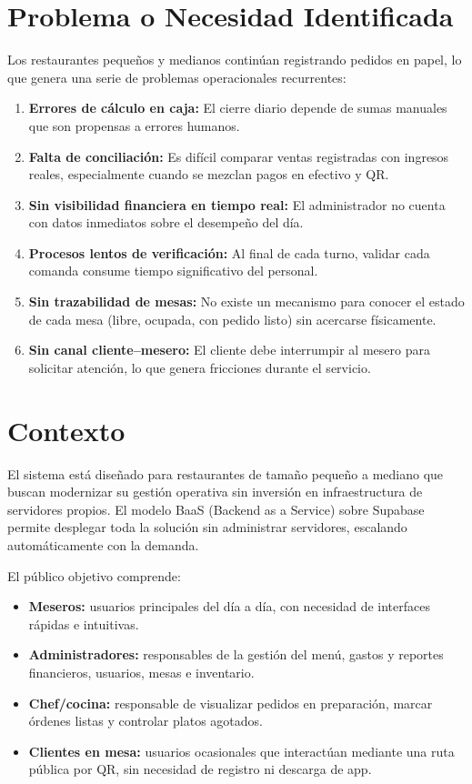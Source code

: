 \section{Problema o Necesidad Identificada}

Los restaurantes pequeños y medianos continúan registrando pedidos en papel, lo que
genera una serie de problemas operacionales recurrentes:

\begin{enumerate}[leftmargin=1.8em]
  \item \textbf{Errores de cálculo en caja:} El cierre diario depende de sumas
        manuales que son propensas a errores humanos.
  \item \textbf{Falta de conciliación:} Es difícil comparar ventas registradas con
        ingresos reales, especialmente cuando se mezclan pagos en efectivo y QR.
  \item \textbf{Sin visibilidad financiera en tiempo real:} El administrador no
        cuenta con datos inmediatos sobre el desempeño del día.
  \item \textbf{Procesos lentos de verificación:} Al final de cada turno, validar
        cada comanda consume tiempo significativo del personal.
  \item \textbf{Sin trazabilidad de mesas:} No existe un mecanismo para conocer
        el estado de cada mesa (libre, ocupada, con pedido listo) sin acercarse
        físicamente.
  \item \textbf{Sin canal cliente–mesero:} El cliente debe interrumpir al mesero
        para solicitar atención, lo que genera fricciones durante el servicio.
\end{enumerate}

\section{Contexto}

El sistema está diseñado para restaurantes de tamaño pequeño a mediano que buscan
modernizar su gestión operativa sin inversión en infraestructura de servidores
propios. El modelo BaaS (Backend as a Service) sobre Supabase permite desplegar
toda la solución sin administrar servidores, escalando automáticamente con la
demanda.

El público objetivo comprende:
\begin{itemize}[leftmargin=1.5em]
  \item \textbf{Meseros:} usuarios principales del día a día, con necesidad de
        interfaces rápidas e intuitivas.
  \item \textbf{Administradores:} responsables de la gestión del menú, gastos y
        reportes financieros, usuarios, mesas e inventario.
  \item \textbf{Chef/cocina:} responsable de visualizar pedidos en preparación,
        marcar órdenes listas y controlar platos agotados.
  \item \textbf{Clientes en mesa:} usuarios ocasionales que interactúan mediante
        una ruta pública por QR, sin necesidad de registro ni descarga de app.
\end{itemize}

